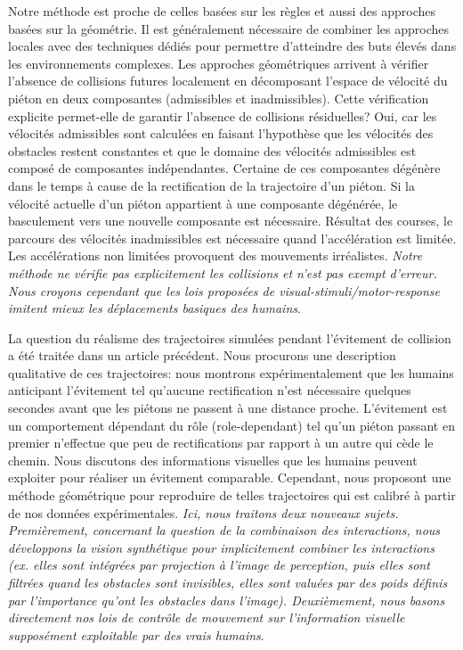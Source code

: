 \documentclass[11pt]{article}
\begin{document}
Notre méthode est proche de celles basées sur les règles et aussi des approches basées sur la géométrie. Il est généralement nécessaire de combiner les approches locales avec des techniques dédiés pour permettre d'atteindre des buts élevés dans les environnements complexes. Les approches géométriques arrivent à vérifier l'absence de collisions futures localement en décomposant l'espace de  vélocité du piéton en deux composantes (admissibles et inadmissibles). Cette vérification explicite permet-elle de garantir l'absence de collisions résiduelles? Oui, car les vélocités admissibles sont calculées en faisant l'hypothèse que les vélocités des obstacles restent constantes et que le domaine des vélocités admissibles est composé de composantes indépendantes. Certaine de ces composantes dégénère dans le temps à cause de la rectification de la trajectoire d'un piéton. Si la vélocité actuelle d'un piéton appartient à une composante dégénérée, le basculement vers une nouvelle composante est nécessaire. Résultat des courses, le parcours des vélocités inadmissibles est nécessaire quand l'accélération est limitée. Les accélérations non limitées provoquent des mouvements irréalistes. \textit{Notre méthode ne vérifie pas explicitement les collisions et n'est pas exempt d'erreur. Nous croyons cependant que les lois proposées de visual-stimuli/motor-response imitent mieux les déplacements basiques des humains}.

La question du réalisme des trajectoires simulées pendant l'évitement de collision a été traitée dans un article précédent\cite{pettre-09}. Nous procurons une description qualitative de ces trajectoires: nous montrons expérimentalement que les humains anticipant l'évitement tel qu'aucune rectification n'est nécessaire quelques secondes avant que les piétons ne passent à une distance proche. L'évitement est un comportement dépendant du rôle (role-dependant) tel qu'un piéton passant en premier n'effectue que peu de rectifications par rapport à un autre qui cède le chemin. Nous discutons des informations visuelles que les humains peuvent exploiter pour réaliser un évitement comparable. Cependant, nous proposont une méthode géométrique pour reproduire de telles trajectoires qui est calibré à partir de nos données expérimentales. 
\textit{Ici, nous traitons deux nouveaux sujets. Premièrement, concernant la question de la combinaison des interactions, nous développons la vision synthétique pour implicitement combiner les interactions (ex. elles sont intégrées par projection à l'image de perception, puis elles sont filtrées quand les obstacles sont invisibles, elles sont valuées par des poids définis par l'importance qu'ont les obstacles dans l'image). Deuxièmement, nous basons directement nos lois de contrôle de mouvement sur l'information visuelle supposément exploitable par des vrais humains}.
\end{document}

